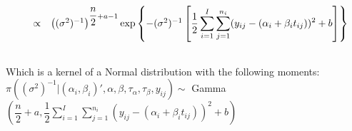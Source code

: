 \documentclass{article}
\begin{document}
\begin{equation*}
\begin{array}{lcl ll }

 & \propto & \left((\sigma^2)^{-1}\right)^{\dfrac{n}{2} + a - 1}\mbox{exp}\left\{ - (\sigma^2)^{-1} \left[\dfrac{1}{2}\displaystyle\sum_{i=1}^{I}\displaystyle\sum_{j=1}^{n_i}(y_{ij} - (\alpha_i + \beta_i t_{ij}))^2 + b \right] \right\} \\ \\

 \end{array}
\end{equation*}

Which is a kernel of a Normal distribution with the following moments:\\

$\pi((\sigma^2)^{-1}|(\alpha_i, \beta_i)', \alpha, \beta, \tau_\alpha, \tau_\beta, y_{ij}) \sim $ Gamma $\left( \dfrac{n}{2} + a , \dfrac{1}{2}\displaystyle\sum_{i=1}^{I}\displaystyle\sum_{j=1}^{n_i}(y_{ij} - (\alpha_i + \beta_i t_{ij}))^2 + b \right)$
\end{document}

